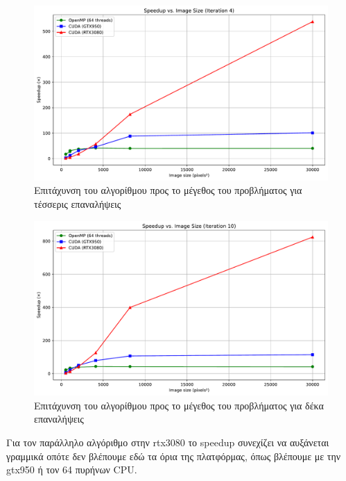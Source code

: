 \begin{figure}[H]
    \centering
    \includegraphics[width=\linewidth]{./pics/speedupCurves_4.pdf}
    \caption{Επιτάχυνση του αλγορίθμου προς το μέγεθος του προβλήματος για τέσσερις επαναλήψεις}
\end{figure}

\begin{figure}[H]
    \centering
    \includegraphics[width=\linewidth]{./pics/speedupCurves_10.pdf}
    \caption{Επιτάχυνση του αλγορίθμου προς το μέγεθος του προβλήματος για δέκα επαναλήψεις}
\end{figure}

Για τον παράλληλο αλγόριθμο στην rtx3080 το speedup συνεχίζει να αυξάνεται γραμμικά οπότε δεν βλέπουμε εδώ τα όρια της πλατφόρμας, όπως βλέπουμε με την gtx950 ή τον 64 πυρήνων CPU.
